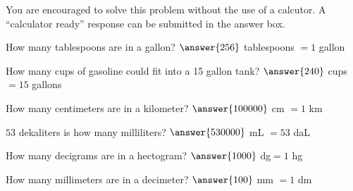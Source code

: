 \documentclass{ximera}
\author{David Kish}
\begin{document}
You are encouraged to solve this problem without the use of a calcutor. A ``calculator ready'' response can be submitted in the answer box.
\begin{exercise}
 How many tablespoons are in a gallon? 
 $\answer{256}$ tablespoons $= 1$ gallon
 \end{exercise}
  \begin{exercise}
 How many cups of gasoline could fit into a 15 gallon tank?
 $\answer{240}$ cups $= 15$ gallons
 \end{exercise}
  \begin{exercise}
 How many centimeters are in a kilometer? 
 $\answer{100000}$ cm $= 1$ km
 \end{exercise}
   \begin{exercise}
 $53$ dekaliters is how many milliliters?
 $\answer{530000}$ mL $= 53$ daL
 \end{exercise}
   \begin{exercise}
 How many decigrams are in a hectogram? 
$ \answer{1000}$ dg$ = 1$ hg
 \end{exercise}
   \begin{exercise}
 How many millimeters are in a decimeter?
 $\answer{100}$ mm $= 1$ dm
 \end{exercise}
\end{document}
